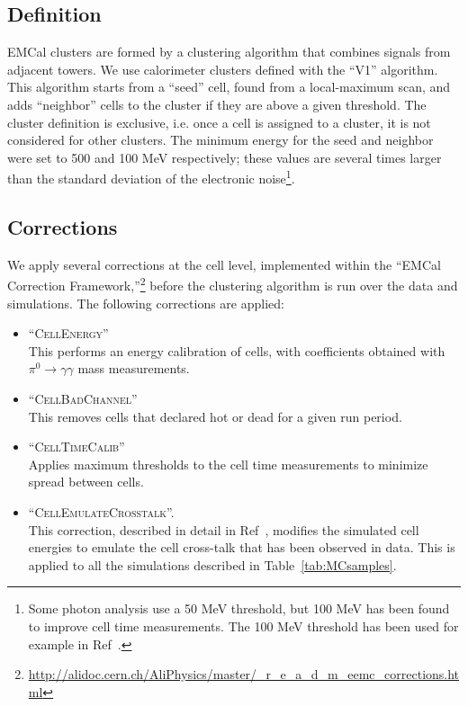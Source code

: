 \subsection{Definition}
EMCal clusters are formed by a clustering algorithm that combines signals from adjacent towers. We use calorimeter clusters defined with the ``V1'' algorithm. This algorithm starts from a ``seed'' cell, found from a local-maximum scan, and adds ``neighbor'' cells to the cluster if they are above a given threshold. The cluster definition is exclusive, i.e. once a cell is assigned to a cluster, it is not considered for other clusters. The minimum energy for the seed and neighbor were set to 500 and 100 MeV respectively; these values are several times larger than the standard deviation of the electronic noise\footnote{Some photon analysis use a 50 MeV threshold, but 100 MeV has been found to improve cell time measurements. The 100 MeV threshold has been used for example in Ref~\cite{Acharya:2017tlv}.}.

\subsection{Corrections}
We apply several corrections at the cell level, implemented within the ``EMCal Correction Framework,''\footnote{\url{http://alidoc.cern.ch/AliPhysics/master/_r_e_a_d_m_eemc_corrections.html} } before the clustering algorithm is run over the data and simulations. The following corrections are applied: 
\begin{itemize}
\item ``\textsc{CellEnergy}''\\
This performs an energy calibration of cells, with coefficients obtained with $\pi^{0}\to\gamma\gamma$ mass measurements.
\item ``\textsc{CellBadChannel}''\\
This removes cells that declared hot or dead for a given run period. 
\item ``\textsc{CellTimeCalib}''\\
Applies maximum thresholds to the cell time measurements to minimize spread between cells.
\item ``\textsc{CellEmulateCrosstalk}''. \\
This correction, described in detail in Ref~\cite{CrossTalk}, modifies the simulated cell energies to emulate the cell cross-talk that has been observed in data. This is applied to all the simulations described in Table~\ref{tab:MCsamples}. 
\end{itemize}

